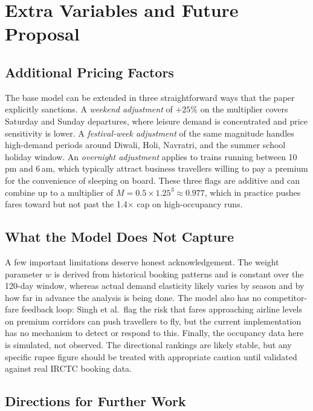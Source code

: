 \documentclass[10pt,a4paper]{article}
\begin{document}
\section{Extra Variables and Future Proposal}

\subsection{Additional Pricing Factors}
 
The base model can be extended in three straightforward ways that the paper explicitly sanctions. A \textit{weekend adjustment} of $+25\%$ on the multiplier covers Saturday and Sunday departures, where leisure demand is concentrated and price sensitivity is lower. A \textit{festival-week adjustment} of the same magnitude handles high-demand periods around Diwali, Holi, Navratri, and the summer school holiday window. An \textit{overnight adjustment} applies to trains running between 10\,pm and 6\,am, which typically attract business travellers willing to pay a premium for the convenience of sleeping on board. These three flags are additive and can combine up to a multiplier of $M = 0.5 \times 1.25^3 \approx 0.977$, which in practice pushes fares toward but not past the 1.4$\times$ cap on high-occupancy runs.
 
\subsection{What the Model Does Not Capture}
 
A few important limitations deserve honest acknowledgement. The weight parameter $w$ is derived from historical booking patterns and is constant over the 120-day window, whereas actual demand elasticity likely varies by season and by how far in advance the analysis is being done. The model also has no competitor-fare feedback loop: Singh et al.\ flag the risk that fares approaching airline levels on premium corridors can push travellers to fly, but the current implementation has no mechanism to detect or respond to this. Finally, the occupancy data here is simulated, not observed. The directional rankings are likely stable, but any specific rupee figure should be treated with appropriate caution until validated against real IRCTC booking data.
 
\subsection{Directions for Further Work}
 
\end{document}
